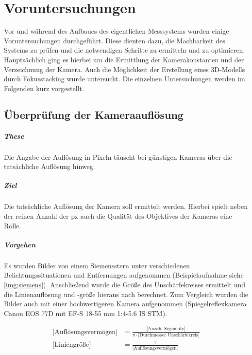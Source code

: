 \documentclass[./00PhotoBox.tex]{subfiles}
\begin{document}
\chapter{Voruntersuchungen}
\label{c:voruntersuchungen}
Vor und während des Aufbaues des eigentlichen Messsystems wurden einige Voruntersuchungen durchgeführt. Diese dienten dazu, die Machbarkeit des Systems zu prüfen und die notwendigen Schritte zu ermitteln und zu optimieren. Hauptsächlich ging es hierbei um die Ermittlung der Kamerakonstanten und der \Gls{Verzeichnung} der Kamera. Auch die Möglichkeit der Erstellung eines 3D-Modells durch Fokusstacking wurde untersucht. Die einzelnen Untersuchungen werden im Folgenden kurz vorgestellt.

\section{Überprüfung der Kameraauflösung}

\paragraph{These}
Die Angabe der Auflösung in Pixeln täuscht bei günstigen Kameras über die tatsächliche Auflösung hinweg.

\paragraph{Ziel}
Die tatsächliche Auflösung der Kamera soll ermittelt werden. Hierbei spielt neben der reinen Anzahl der \acrfull{px} auch die Qualität des Objektives der Kameras eine Rolle.

\paragraph{Vorgehen}
Es wurden Bilder von einem Siemensstern unter verschiedenen Belichtungssituationen und Entfernungen aufgenommen (Beispielaufnahme siehe \autoref{img:siemens}). Anschließend wurde die Größe des Unschärfekreises ermittelt und die Linienauflösung und -größe hieraus nach \citet[S. 161]{luhmann} berechnet. Zum Vergleich wurden die Bilder auch mit einer hochwertigeren Kamera aufgenommen (Spiegelreflexkamera Canon EOS 77D mit EF-S 18-55 mm 1:4-5.6 IS STM).

\begin{align*}
    \text{[Auflösungsvermögen]} & = \frac{\text{[Anzahl Segmente]}}{\pi \cdot \text{[Durchmesser Unschärfekreis]}} \\
    \text{[Liniengröße]}        & = \frac{1}{\text{[Auflösungsvermögen]}}
\end{align*}
\end{document}
